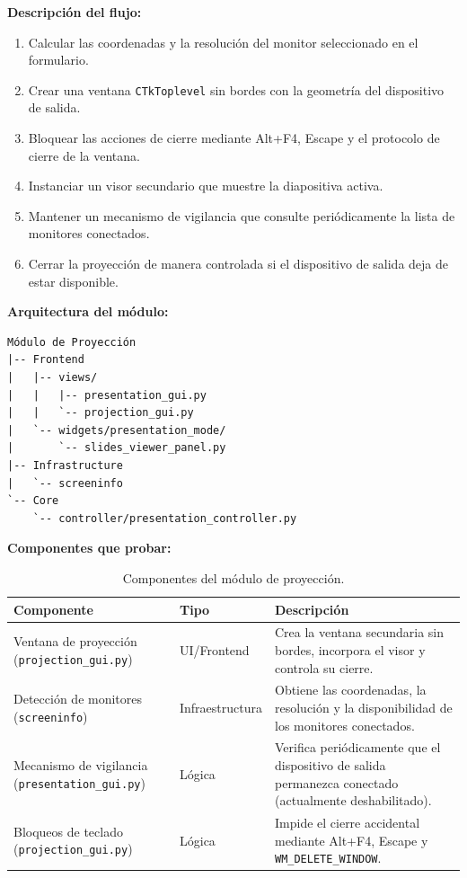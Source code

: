 \documentclass[12pt,letterpaper]{article}
\begin{document}
\textbf{Descripción del flujo:}
\begin{enumerate}
    \item Calcular las coordenadas y la resolución del monitor seleccionado en el formulario.
    \item Crear una ventana \texttt{CTkToplevel} sin bordes con la geometría del dispositivo de salida.
    \item Bloquear las acciones de cierre mediante Alt+F4, Escape y el protocolo de cierre de la ventana.
    \item Instanciar un visor secundario que muestre la diapositiva activa.
    \item Mantener un mecanismo de vigilancia que consulte periódicamente la lista de monitores conectados.
    \item Cerrar la proyección de manera controlada si el dispositivo de salida deja de estar disponible.
\end{enumerate}

\textbf{Arquitectura del módulo:}
\begin{verbatim}
Módulo de Proyección
|-- Frontend
|   |-- views/
|   |   |-- presentation_gui.py
|   |   `-- projection_gui.py
|   `-- widgets/presentation_mode/
|       `-- slides_viewer_panel.py
|-- Infrastructure
|   `-- screeninfo
`-- Core
    `-- controller/presentation_controller.py
\end{verbatim}

\textbf{Componentes que probar:}

\begin{table}[H]
    \centering
    \begin{tabular}{|L{0.34\textwidth}|L{0.18\textwidth}|L{0.38\textwidth}|}
        \hline
        \textbf{Componente} & \textbf{Tipo} & \textbf{Descripción} \\ \hline
        Ventana de proyección (\texttt{projection\_gui.py}) & UI/Frontend & Crea la ventana secundaria sin bordes, incorpora el visor y controla su cierre. \\ \hline
        Detección de monitores (\texttt{screeninfo}) & Infraestructura & Obtiene las coordenadas, la resolución y la disponibilidad de los monitores conectados. \\ \hline
        Mecanismo de vigilancia (\texttt{presentation\_gui.py}) & Lógica & Verifica periódicamente que el dispositivo de salida permanezca conectado (actualmente deshabilitado). \\ \hline
        Bloqueos de teclado (\texttt{projection\_gui.py}) & Lógica & Impide el cierre accidental mediante Alt+F4, Escape y \texttt{WM\_DELETE\_WINDOW}. \\ \hline
    \end{tabular}
    \caption{Componentes del módulo de proyección.}
    \label{tab:componentes-modulo-proyeccion}
\end{table}
\end{document}
